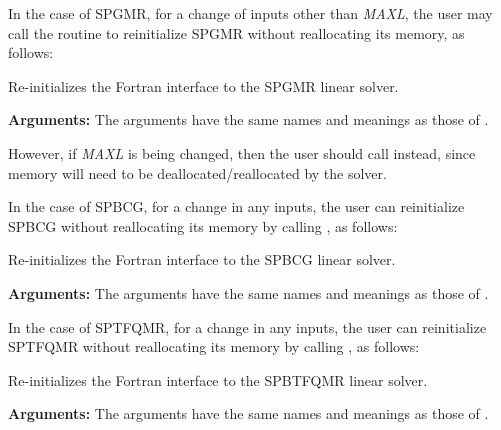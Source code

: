 \documentclass[letterpaper,10pt,english]{sphinxmanual}
\begin{document}
In the case of SPGMR, for a change of inputs other than \emph{MAXL},
the user may call the routine {\hyperref[f_interface/Usage:f/_/FARKSPGMRREINIT]{\emph{}}} to
reinitialize SPGMR without reallocating its memory, as follows:

\begin{fulllineitems}
\label{f_interface/Usage:f/_/FARKSPGMRREINIT}
Re-initializes the Fortran interface to the SPGMR linear solver.

\textbf{Arguments:}  The arguments have the same names and meanings as those of
{\hyperref[f_interface/Usage:f/_/FARKSPGMR]{\emph{}}}.

\end{fulllineitems}


However, if \emph{MAXL} is being changed, then the user should call
{\hyperref[f_interface/Usage:f/_/FARKSPGMR]{\emph{}}} instead, since memory will need to be
deallocated/reallocated by the solver.

In the case of SPBCG, for a change in any inputs, the user can
reinitialize SPBCG without reallocating its memory by calling
{\hyperref[f_interface/Usage:f/_/FARKSPBCGREINIT]{\emph{}}}, as follows:

\begin{fulllineitems}
\label{f_interface/Usage:f/_/FARKSPBCGREINIT}
Re-initializes the Fortran interface to the SPBCG
linear solver.

\textbf{Arguments:}  The arguments have the same names and meanings as
those of {\hyperref[f_interface/Usage:f/_/FARKSPBCG]{\emph{}}}.

\end{fulllineitems}


In the case of SPTFQMR, for a change in any inputs, the user can
reinitialize SPTFQMR without reallocating its memory by calling
{\hyperref[f_interface/Usage:f/_/FARKSPTFQMRREINIT]{\emph{}}}, as follows:

\begin{fulllineitems}
\label{f_interface/Usage:f/_/FARKSPTFQMRREINIT}
Re-initializes the Fortran interface to the SPBTFQMR
linear solver.

\textbf{Arguments:}  The arguments have the same names and meanings as
those of {\hyperref[f_interface/Usage:f/_/FARKSPTFQMR]{\emph{}}}.

\end{fulllineitems}
\end{document}
